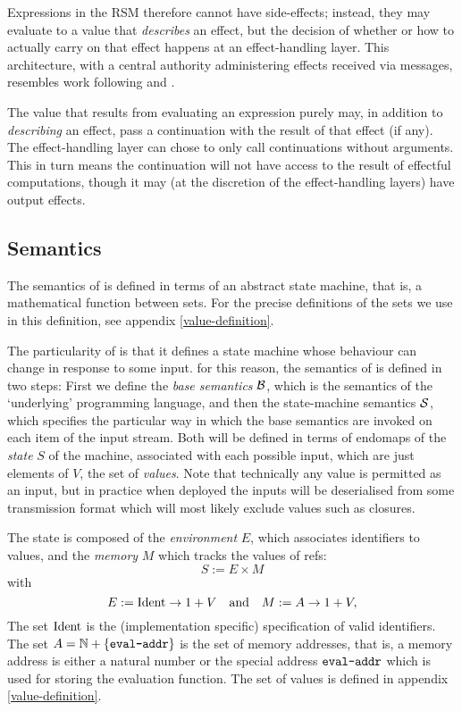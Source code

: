 Expressions in the RSM therefore cannot have
side-effects; instead, they may evaluate to a value that \emph{describes} an effect,
but the decision of whether or how to actually carry on that effect happens at an
effect-handling layer. This architecture, with a central authority
administering effects received via messages, resembles work following
\cite{Cartwright1994} and \cite{Bauer2013}.

The value that results from evaluating an expression purely may, in addition to
\emph{describing} an effect, pass a continuation with the result of that
effect (if any). The effect-handling layer can chose to only call continuations
without arguments. This in turn means the continuation will not have access to
the result of effectful computations, though it may (at the discretion of the
effect-handling layers) have output effects.

\subsection{Semantics}

The semantics of \rad{} is defined in terms of an abstract state machine, that
is, a mathematical function between sets. For the precise definitions of the
sets we use in this definition, see appendix \ref{value-definition}.

The particularity of \rad{} is that it defines a state machine whose behaviour
can change in response to some input. for this reason, the semantics of \rad{}
is defined in two steps: First we define the \emph{base semantics} $\B$, which
is the semantics of the `underlying' programming language, and then the
state-machine semantics $\S$, which specifies the particular way in which the
base semantics are invoked on each item of the input stream. Both will be
defined in terms of endomaps of the \emph{state} $S$ of the machine, associated
with each possible input, which are just elements of $V$, the set of
\emph{values}. Note that technically any value is permitted as an input, but in
practice when deployed the inputs will be deserialised from some transmission
format which will most likely exclude values such as closures.

The state is composed of the \emph{environment} $E$, which associates identifiers to
values, and the \emph{memory} $M$ which tracks the values of refs:
\[
S := E \times M
\]
with
\[
E := \Ident \to 1 + V \quad \text{and} \quad M := A \to 1 + V,
\]
The set $\Ident$ is the (implementation specific) specification of valid
identifiers. The set $A = \mathbb{N} + \{\evalAddr\}$ is the set of memory
addresses, that is, a memory address is either a natural number or the special
address $\evalAddr$ which is used for storing the evaluation function. The set
of values is defined in appendix \ref{value-definition}.

